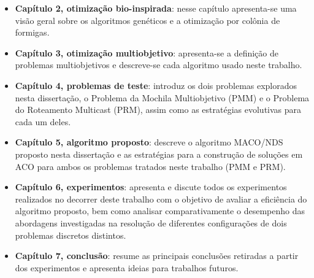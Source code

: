 \begin{itemize}  
	\item \textbf{Capítulo 2, otimização bio-inspirada}: nesse capítulo apresenta-se uma visão geral sobre os algoritmos genéticos e a otimização por colônia de formigas.
	\item \textbf{Capítulo 3, otimização multiobjetivo}: apresenta-se a definição de problemas multiobjetivos e descreve-se cada algoritmo usado neste trabalho.
	\item \textbf{Capítulo 4, problemas de teste}: introduz os dois problemas explorados nesta dissertação, o Problema da Mochila Multiobjetivo (PMM) e o Problema do Roteamento Multicast (PRM), assim como as estratégias evolutivas para cada um deles.
	\item \textbf{Capítulo 5, algoritmo proposto}: descreve o algoritmo \ac{MACO/NDS} proposto nesta dissertação e as estratégias para a construção de soluções em ACO para ambos os problemas tratados neste trabalho (PMM e PRM).
	\item \textbf{Capítulo 6, experimentos}: apresenta e discute todos os experimentos realizados no decorrer deste trabalho com o objetivo de avaliar a eficiência do algoritmo proposto, bem como analisar comparativamente o desempenho das abordagens investigadas na resolução de diferentes configurações de dois problemas discretos distintos.
	\item \textbf{Capítulo 7, conclusão}: resume as principais conclusões retiradas a partir dos experimentos e apresenta ideias para trabalhos futuros.
\end{itemize}